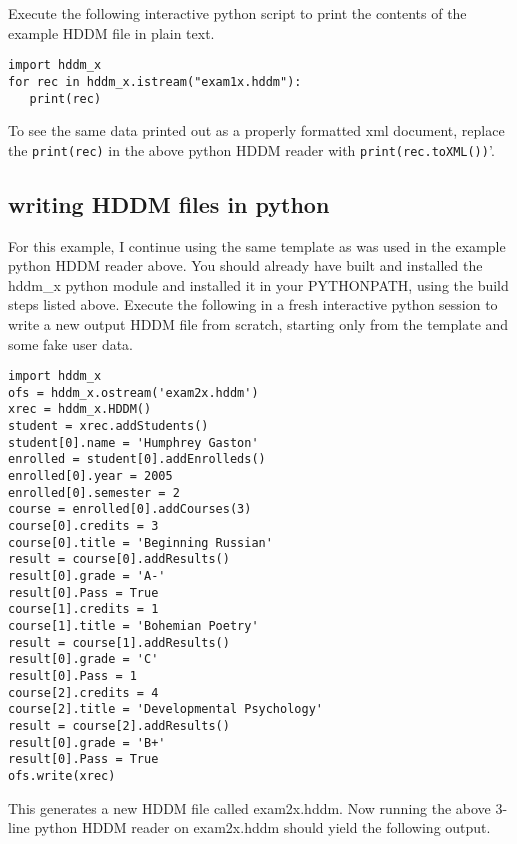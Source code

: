 \documentclass{revtex4}
\begin{document}
Execute the following interactive python script to print the contents of the
example HDDM file in plain text.

\vspace{0.5cm}
\begin{minipage}{12cm}
\begin{verbatim}
import hddm_x
for rec in hddm_x.istream("exam1x.hddm"):
   print(rec)
\end{verbatim}
\end{minipage}
\vspace{0.5cm}

To see the same data printed out as a properly formatted xml document, replace
the \texttt{print(rec)} in the above python HDDM reader with 
\texttt{print(rec.toXML())}'. 

\subsection{writing HDDM files in python}

For this example, I continue using the same template as was used in the
example python HDDM reader above. You should already have built and installed
the hddm\_x python module and installed it in your PYTHONPATH, using the build
steps listed above. Execute the following in a fresh interactive python session
to write a new output HDDM file from scratch, starting only from the template
and some fake user data.

\vspace{0.5cm}
\begin{minipage}{12cm}
\begin{verbatim}
import hddm_x
ofs = hddm_x.ostream('exam2x.hddm')
xrec = hddm_x.HDDM()
student = xrec.addStudents()
student[0].name = 'Humphrey Gaston'
enrolled = student[0].addEnrolleds()
enrolled[0].year = 2005
enrolled[0].semester = 2
course = enrolled[0].addCourses(3)
course[0].credits = 3
course[0].title = 'Beginning Russian'
result = course[0].addResults()
result[0].grade = 'A-'
result[0].Pass = True
course[1].credits = 1
course[1].title = 'Bohemian Poetry'
result = course[1].addResults()
result[0].grade = 'C'
result[0].Pass = 1
course[2].credits = 4
course[2].title = 'Developmental Psychology'
result = course[2].addResults()
result[0].grade = 'B+'
result[0].Pass = True
ofs.write(xrec)
\end{verbatim}
\end{minipage}
\vspace{0.5cm}

This generates a new HDDM file called exam2x.hddm. Now running the above 3-{}line
python HDDM reader on exam2x.hddm should yield the following output.
\end{document}
